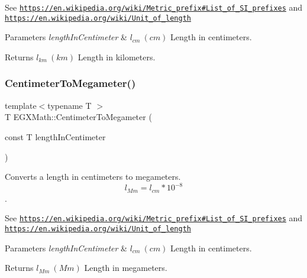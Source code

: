 See \href{https://en.wikipedia.org/wiki/Metric_prefix#List_of_SI_prefixes}{\tt https\+://en.\+wikipedia.\+org/wiki/\+Metric\+\_\+prefix\#\+List\+\_\+of\+\_\+\+S\+I\+\_\+prefixes} and \href{https://en.wikipedia.org/wiki/Unit_of_length}{\tt https\+://en.\+wikipedia.\+org/wiki/\+Unit\+\_\+of\+\_\+length} 
\begin{DoxyParams}{Parameters}
{\em length\+In\+Centimeter} & $ l_{cm}\ (cm)$ Length in centimeters. \\
\hline
\end{DoxyParams}
\begin{DoxyReturn}{Returns}
$ l_{km}\ (km)$ Length in kilometers. 
\end{DoxyReturn}
\mbox{\label{group___e_g_x_math-_conversions-_length_conversions-_s_i-_centimeter-_s_i_ga5ba81fb6190e6ce0032410d703d5073b}} 
\subsubsection{\texorpdfstring{Centimeter\+To\+Megameter()}{CentimeterToMegameter()}}
{\footnotesize\ttfamily template$<$typename T $>$ \\
T E\+G\+X\+Math\+::\+Centimeter\+To\+Megameter (\begin{DoxyParamCaption}\item[{const T}]{length\+In\+Centimeter }\end{DoxyParamCaption})}



Converts a length in centimeters to megameters. \[ l_{Mm}=l_{cm} * 10^{-8} \]. 

See \href{https://en.wikipedia.org/wiki/Metric_prefix#List_of_SI_prefixes}{\tt https\+://en.\+wikipedia.\+org/wiki/\+Metric\+\_\+prefix\#\+List\+\_\+of\+\_\+\+S\+I\+\_\+prefixes} and \href{https://en.wikipedia.org/wiki/Unit_of_length}{\tt https\+://en.\+wikipedia.\+org/wiki/\+Unit\+\_\+of\+\_\+length} 
\begin{DoxyParams}{Parameters}
{\em length\+In\+Centimeter} & $ l_{cm}\ (cm)$ Length in centimeters. \\
\hline
\end{DoxyParams}
\begin{DoxyReturn}{Returns}
$ l_{Mm}\ (Mm)$ Length in megameters. 
\end{DoxyReturn}
\mbox{\label{group___e_g_x_math-_conversions-_length_conversions-_s_i-_centimeter-_s_i_gaebbc38cdc9fa18257e8cf4a0bbbb117a}} 
